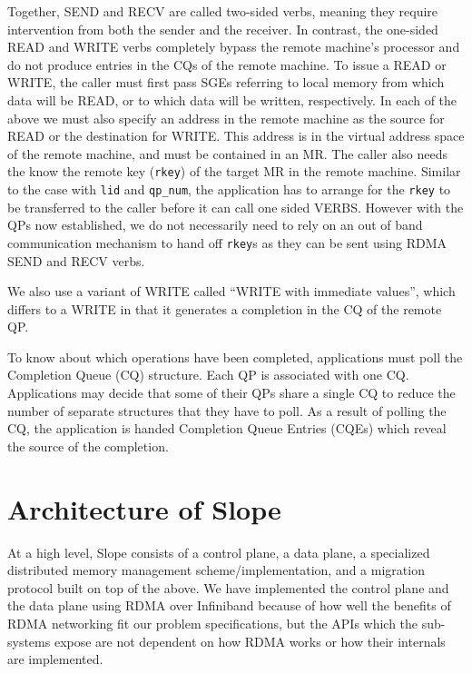 Together, SEND and RECV are called two-sided verbs, meaning they require
intervention from both the sender and the receiver. In contrast, the one-sided
READ and WRITE verbs completely bypass the remote machine's processor and do not
produce entries in the CQs of the remote machine. To
issue a READ or WRITE, the caller must first pass SGEs referring to local memory
from which data will be READ, or to which data will be written, respectively.
In each of the above we must also specify an address in the remote machine
as the source for READ or the destination for WRITE. This address is in
the virtual address space of the remote machine, and must be contained in an
MR. The caller also needs the know the remote key (\texttt{rkey}) of the target
MR in the remote machine. Similar to the case with \texttt{lid} and
\texttt{qp\_num}, the application has to arrange for the \texttt{rkey} to be
transferred to the caller before it can call one sided VERBS. However with the
QPs now established, we do not necessarily need to rely on an out of band
communication mechanism to hand off \texttt{rkey}s as they can be sent using
RDMA SEND and RECV verbs.

We also use a variant of WRITE called ``WRITE with immediate values'', which
differs to a WRITE in that it generates a completion in the CQ of the
remote QP.

To know about which operations have been completed, applications must poll the
Completion Queue (CQ) structure.
Each QP is associated with one CQ. Applications may decide that some of their
QPs share a single CQ to reduce the number of separate structures that they
have to poll. As a result of polling the CQ, the application is handed
Completion Queue Entries (CQEs) which reveal the source of the completion.


\section{Architecture of Slope}
At a high level, Slope consists of  a control plane, a data plane,
a specialized distributed memory management
scheme/implementation, and a migration protocol
built on top
of the above. We have implemented the control plane and the data plane using
RDMA over Infiniband because of how well the benefits of RDMA networking
fit our problem specifications, but the APIs which the 
sub-systems expose are not dependent on how RDMA works or how their internals
are implemented.



